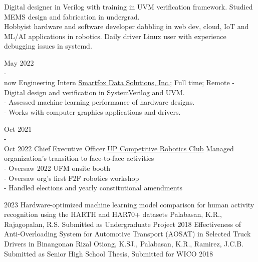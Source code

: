 \documentclass[9pt]{developercv}
\begin{document}
\begin{minipage}[t]{0.475\textwidth} 
	\vspace{-\baselineskip}

	Digital designer in Verilog with training in UVM verification framework. Studied MEMS design and fabrication in undergrad. \\

	Hobbyist hardware and software developer dabbling in web dev, cloud, IoT and ML/AI applications in robotics. Daily driver Linux user with experience debugging issues in systemd.


	\begin{entrylist}
		\entry
			{May 2022 \\ - \\ now}
			{Engineering Intern}
			{\href{https://smartfoxdata.com}{Smartfox Data Solutions, Inc.}; Full time; Remote}
			{
				- Digital design and verification in SystemVerilog and UVM. \\
				- Assessed machine learning performance of hardware designs. \\
				- Works with computer graphics applications and drivers.
			}	
	\end{entrylist}
	\cvsect{Organizations}
	\begin{entrylist}
		\entry
			{Oct 2021 \\ - \\ Oct 2022}
			{Chief Executive Officer}
			{\href{https://upcrc.org}{UP Competitive Robotics Club}}
			{Managed organization's transition to face-to-face activities\\
			- Oversaw 2022 UFM onsite booth\\
			- Oversaw org's first F2F robotics workshop\\
			- Handled elections and yearly constitutional amendments}
	\end{entrylist}
	\cvsect{Publications}
	\begin{entrylist}
		\entry
			{2023}
			{Hardware-optimized machine learning model comparison for human activity recognition using the HARTH and HAR70+ datasets}
			{Palabasan, K.R., Rajagopalan, R.S.}
			{Submitted as Undergraduate Project}
		\entry
			{2018}
			{Effectiveness of Anti-Overloading System for Automotive Transport (AOSAT) in Selected Truck Drivers in Binangonan Rizal}
			{Otiong, K.SJ., Palabasan, K.R., Ramirez, J.C.B.}
			{Submitted as Senior High School Thesis, Submitted for WICO 2018}
	\end{entrylist}

\end{minipage}
\end{document}
